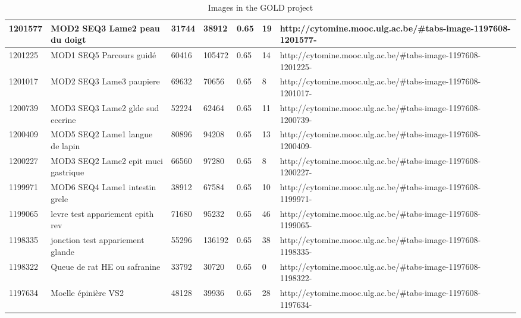 \documentclass[a4paper,11pt]{report}
\numberwithin{figure}{section} %
\begin{document}
\begin{table}[]
{\begin{tabular}{|l|l|l|l|l|l|l|}
1201577  & MOD2 SEQ3 Lame2 peau du doigt                                                                & 31744  & 38912  & 0.65                  & 19          & http://cytomine.mooc.ulg.ac.be/\#tabs-image-1197608-1201577-  \\ \hline
1201225  & MOD1 SEQ5 Parcours guid\'{e}                                                                     & 60416  & 105472 & 0.65                  & 14          & http://cytomine.mooc.ulg.ac.be/\#tabs-image-1197608-1201225-  \\ \hline
1201017  & MOD2 SEQ3 Lame3 paupiere                                                                     & 69632  & 70656  & 0.65                  & 8           & http://cytomine.mooc.ulg.ac.be/\#tabs-image-1197608-1201017-  \\ \hline
1200739  & MOD3 SEQ3 Lame2 glde sud eccrine                                                             & 52224  & 62464  & 0.65                  & 11          & http://cytomine.mooc.ulg.ac.be/\#tabs-image-1197608-1200739-  \\ \hline
1200409  & MOD5 SEQ2 Lame1 langue de lapin                                                              & 80896  & 94208  & 0.65                  & 13          & http://cytomine.mooc.ulg.ac.be/\#tabs-image-1197608-1200409-  \\ \hline
1200227  & MOD3 SEQ2 Lame2 epit muci gastrique                                                          & 66560  & 97280  & 0.65                  & 8           & http://cytomine.mooc.ulg.ac.be/\#tabs-image-1197608-1200227-  \\ \hline
1199971  & MOD6 SEQ4 Lame1 intestin grele                                                               & 38912  & 67584  & 0.65                  & 10          & http://cytomine.mooc.ulg.ac.be/\#tabs-image-1197608-1199971-  \\ \hline
1199065  & levre test appariement epith rev                                                             & 71680  & 95232  & 0.65                  & 46          & http://cytomine.mooc.ulg.ac.be/\#tabs-image-1197608-1199065-  \\ \hline
1198335  & jonction test appariement glande                                                             & 55296  & 136192 & 0.65                  & 38          & http://cytomine.mooc.ulg.ac.be/\#tabs-image-1197608-1198335-  \\ \hline
1198322  & Queue de rat HE ou safranine                                                                 & 33792  & 30720  & 0.65                  & 0           & http://cytomine.mooc.ulg.ac.be/\#tabs-image-1197608-1198322-  \\ \hline
1197634  & Moelle \'{e}pini\`{e}re VS2                                                                          & 48128  & 39936  & 0.65                  & 28          & http://cytomine.mooc.ulg.ac.be/\#tabs-image-1197608-1197634-  \\ \hline
\end{tabular}}

\caption{Images in the GOLD project}
\end{table}
\end{document}
